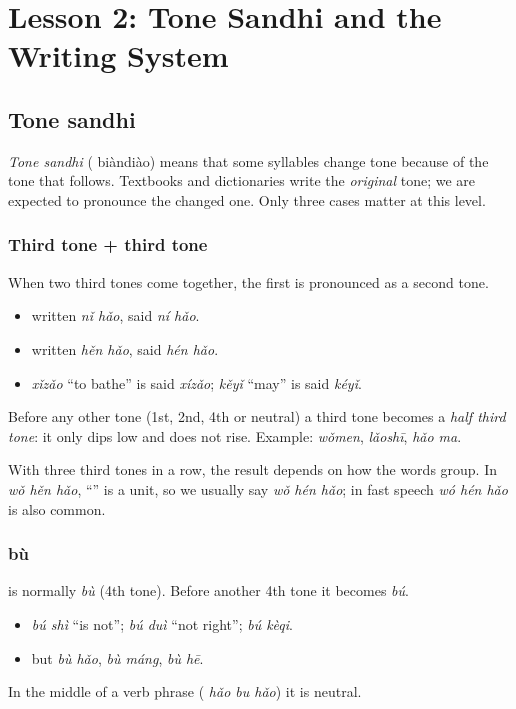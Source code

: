\chapter{Lesson 2: Tone Sandhi and the Writing System}

\section{Tone sandhi}

\emph{Tone sandhi} ( biàndiào) means that some syllables change tone because of
the tone that follows. Textbooks and dictionaries write the \emph{original} tone; we are
expected to pronounce the changed one. Only three cases matter at this level.

\subsection{Third tone + third tone}

\begin{important}
When two third tones come together, the first is pronounced as a second tone.
\begin{itemize}
  \item {} written \emph{nǐ hǎo}, said \emph{ní hǎo}.
  \item {} written \emph{hěn hǎo}, said \emph{hén hǎo}.
  \item {} \emph{xǐzǎo} ``to bathe'' is said \emph{xízǎo};  \emph{kěyǐ}
        ``may'' is said \emph{kéyǐ}.
\end{itemize}
\end{important}

Before any other tone (1st, 2nd, 4th or neutral) a third tone becomes a \emph{half third
tone}: it only dips low and does not rise. Example:  \emph{wǒmen}, 
\emph{lǎoshī},  \emph{hǎo ma}.

With three third tones in a row, the result depends on how the words group. In
 \emph{wǒ hěn hǎo}, ``'' is a unit, so we usually say
\emph{wǒ hén hǎo}; in fast speech \emph{wó hén hǎo} is also common.

\subsection{ bù}

\begin{important}
 is normally \emph{bù} (4th tone). Before another 4th tone it becomes \emph{bú}.
\begin{itemize}
  \item {} \emph{bú shì} ``is not'';  \emph{bú duì} ``not right'';
         \emph{bú kèqi}.
  \item but  \emph{bù hǎo},  \emph{bù máng},  \emph{bù hē}.
\end{itemize}
In the middle of a verb phrase ( \emph{hǎo bu hǎo}) it is neutral.
\end{important}

